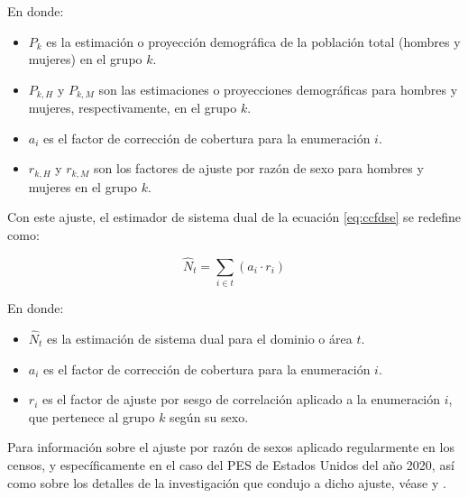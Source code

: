 \documentclass[
  12pt,
]{book}
\providecommand{\tightlist}{%
  \setlength{\itemsep}{0pt}\setlength{\parskip}{0pt}}
\begin{document}
En donde:

\begin{itemize}
\tightlist
\item
  \(P_k\) es la estimación o proyección demográfica de la población total (hombres y mujeres) en el grupo \(k\).
\item
  \(P_{k,H}\) y \(P_{k,M}\) son las estimaciones o proyecciones demográficas para hombres y mujeres, respectivamente, en el grupo \(k\).
\item
  \(a_i\) es el factor de corrección de cobertura para la enumeración \(i\).
\item
  \(r_{k,H}\) y \(r_{k,M}\) son los factores de ajuste por razón de sexo para hombres y mujeres en el grupo \(k\).
\end{itemize}

Con este ajuste, el estimador de sistema dual de la ecuación \eqref{eq:ccfdse} se redefine como:

\begin{equation}
\hat{N}_t = \sum_{i \in t} (a_i \cdot r_i)
\label{eq:dseadj}
\end{equation}

En donde:

\begin{itemize}
\tightlist
\item
  \(\hat{N}_t\) es la estimación de sistema dual para el dominio o área \(t\).
\item
  \(a_i\) es el factor de corrección de cobertura para la enumeración \(i\).
\item
  \(r_i\) es el factor de ajuste por sesgo de correlación aplicado a la enumeración \(i\), que pertenece al grupo \(k\) según su sexo.
\end{itemize}

Para información sobre el ajuste por razón de sexos aplicado regularmente en los censos, y específicamente en el caso del PES de Estados Unidos del año 2020, así como sobre los detalles de la investigación que condujo a dicho ajuste, véase \citet{Heim2022} y \citet{HeimHill2022}.

  
\end{document}
